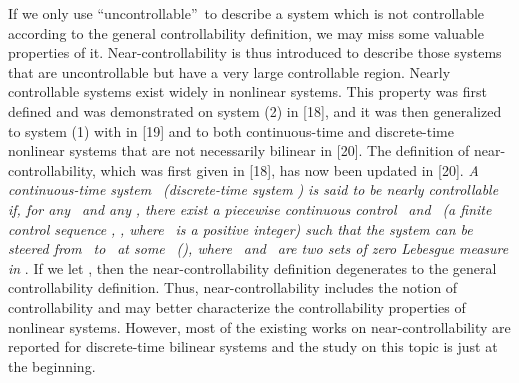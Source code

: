 \documentclass[journal,a4paper,12pt,onecolumn]{IEEEtran}
\begin{document}
If we only use \textquotedblleft uncontrollable\textquotedblright\ to
describe a system which is not controllable according to the general
controllability definition, we may miss some valuable properties of it.
Near-controllability is thus introduced to describe those systems that are
uncontrollable but have a very large controllable region. Nearly
controllable systems exist widely in nonlinear systems. This property was
first defined and was demonstrated on system (2) in [18], and it was then
generalized to system (1) with  in [19] and to both continuous-time and
discrete-time nonlinear systems that are not necessarily bilinear in [20].
The definition of near-controllability, which was first given in [18], has
now been updated in [20]. \textit{A continuous-time system }\textit{\
(discrete-time system }\textit{) is said to be nearly controllable if,
for any }\textit{\ and any }\textit{, there exist a piecewise
continuous control }\textit{\ and }\textit{\ (a
finite control sequence }\textit{, }\textit{, where }\textit{\ is a positive integer) such that the system
can be steered from }\textit{\ to }\textit{\ at some }\textit{\ (}\textit{), where }\textit{\
and }\textit{\ are two sets of zero Lebesgue measure in }. If we let , then the
near-controllability definition degenerates to the general controllability
definition. Thus, near-controllability includes the notion of
controllability and may better characterize the controllability properties
of nonlinear systems. However, most of the existing works on
near-controllability are reported for discrete-time bilinear systems and the
study on this topic is just at the beginning.
\end{document}

